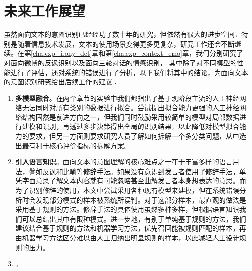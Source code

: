 \section{未来工作展望}

虽然面向文本的意图识别已经经功了数十年的研究，但依然有很大的进步空间，特别是随着信息技术发展，文本的使用场景变得更多更复杂，研究工作还会不断继续。在第\ref{cha:exp_irony_det}章和第\ref{cha:exp_context_emo}章，我们分别研究了对面向微博的反讽识别以及面向三轮对话的情感识别，
其中除了对不同模型的性能进行了评估，还对系统的错误进行了分析，以下我们将其中的结论，为面向文本的意图识别研究给出后续工作的建议：

\begin{enumerate}

\item {\bf 多模型融合}。在两个章节的实验中我们都指出了基于现阶段主流的人工神经网络无法同时对所有类别的数据进行拟合。尝试提出拟合能力更强的人工神经网络结构固然是前进方向之一，但我们同时鼓励采用较简单的模型对局部数据进行建模和识别，再透过多步決策得出全局的识別结果，以此降低对模型拟合能力的要求，但另一方面则要求研究人员了解如何拆解一个多分类问题，从中选出最有利于核心评价指标的拆解方案。

\item {\bf 引入语言知识}。面向文本的意图理解的核心难点之一在于丰富多样的语言用法，譬如反讽和比喻等修辞手法。如果没有意识到发言者使用了修辞手法，单凭字面意思了解文本内容就有可能忽略甚至曲解发言者本身想表达的意思。而为了识别修辞的使用，本文中尝试采用各种现有模型来建模，但在系统错误分析时会发现部分模式的样本被系统所误判。对于这部分样本，最直观的做法是采用基于规则的方法。修辞手法的具体使用虽然多种多样，但根据语言知识我们可以总结出其中有限种模式。进一步地，有别于单纯基于规则的方法，我们建议结合基于规则的方法和机器学习方法，优先召回能被规则匹配的样本，再由机器学习方法区分难以由人工归纳出明显规则的样本，以此减轻人工设计规则的压力。

\item {\bf }。 

\end{enumerate}







